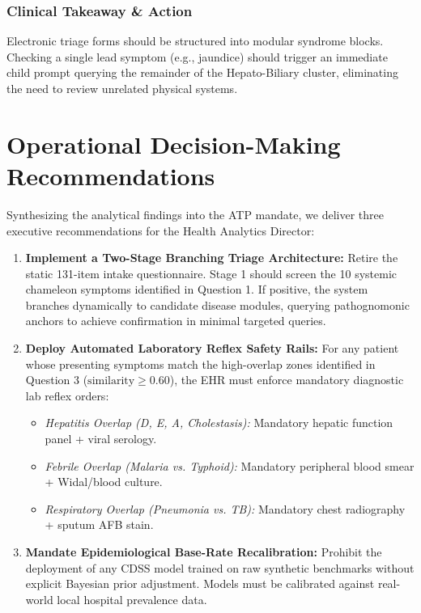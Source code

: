 \documentclass[conference]{IEEEtran}
\begin{document}
\subsubsection{Clinical Takeaway \& Action}
Electronic triage forms should be structured into modular syndrome blocks. Checking a single lead symptom (e.g., jaundice) should trigger an immediate child prompt querying the remainder of the Hepato-Biliary cluster, eliminating the need to review unrelated physical systems.

\FloatBarrier
\section{Operational Decision-Making Recommendations}
Synthesizing the analytical findings into the ATP mandate, we deliver three executive recommendations for the Health Analytics Director:

\begin{enumerate}[leftmargin=*]
    \item \textbf{Implement a Two-Stage Branching Triage Architecture:}
    Retire the static 131-item intake questionnaire. Stage 1 should screen the 10 systemic chameleon symptoms identified in Question 1. If positive, the system branches dynamically to candidate disease modules, querying pathognomonic anchors to achieve confirmation in minimal targeted queries.
    
    \item \textbf{Deploy Automated Laboratory Reflex Safety Rails:}
    For any patient whose presenting symptoms match the high-overlap zones identified in Question 3 ($\text{similarity} \ge 0.60$), the EHR must enforce mandatory diagnostic lab reflex orders:
    \begin{itemize}[noitemsep]
        \item \textit{Hepatitis Overlap (D, E, A, Cholestasis):} Mandatory hepatic function panel + viral serology.
        \item \textit{Febrile Overlap (Malaria vs. Typhoid):} Mandatory peripheral blood smear + Widal/blood culture.
        \item \textit{Respiratory Overlap (Pneumonia vs. TB):} Mandatory chest radiography + sputum AFB stain.
    \end{itemize}
    
    \item \textbf{Mandate Epidemiological Base-Rate Recalibration:}
    Prohibit the deployment of any CDSS model trained on raw synthetic benchmarks without explicit Bayesian prior adjustment. Models must be calibrated against real-world local hospital prevalence data.
\end{enumerate}
\end{document}
